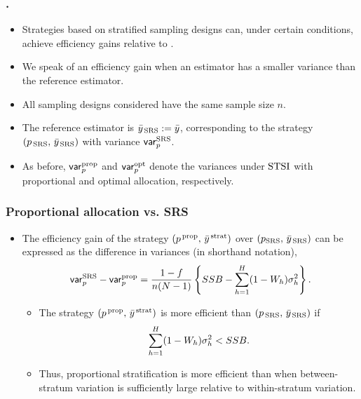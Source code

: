 \documentclass{my_eth_beamer}
\numberwithin{equation}{section}
\begin{document}
\begin{frame}
    \frametitle{\insertsectionnumber.\insertsubsectionnumber~\insertsubsection}
    \begin{itemize}
    \setlength{\itemsep}{12pt}
        \item Strategies based on stratified sampling designs can, under
            certain conditions, achieve \alert{efficiency gains} relative to
            \SRS.
        \item We speak of an efficiency gain when an estimator has a
            \alert{smaller variance than the reference estimator}.
        \item All sampling designs considered have the \alert{same sample size}
            $n$.
        \item The \alert{reference estimator} is $\bar{y}_{\,\mathrm{SRS}} := \bar{y}$,
            corresponding to the strategy $(p_{\,\mathrm{SRS}}, \, \bar{y}_{\,\mathrm{SRS}})$ with variance
            $\mathsf{var}_p^{\mathrm{SRS}}$.
        \item As before, $\mathsf{var}_p^{\mathrm{prop}}$ and $\mathsf{var}_p^{\mathrm{opt}}$ denote the
            variances under $\mathrm{STSI}$ with proportional and optimal allocation,
            respectively.
    \end{itemize}
\end{frame}

\begin{frame}
    \frametitle{\normalsize Proportional allocation vs. SRS}
    \vspace{-0.5em}
    \begin{itemize}
    \setlength{\itemsep}{8pt}
        \item The \alert{efficiency gain} of the strategy
            $(p^{\,\mathrm{prop}},\, \bar{y}^{\,\mathrm{strat}})$ over
            $(p_{\mathrm{SRS}},\,\bar{y}_{\,\mathrm{SRS}})$ can be
            expressed as the \alert{difference in variances} (in shorthand
            notation),
            \begin{equation*}
                \mathsf{var}_p^{\mathrm{SRS}} - \mathsf{var}_p^{\mathrm{prop}} = \frac{1 - f}{n(N - 1)}\left\{SSB
                    - \sum_{h = 1}^H (1 - W_h)\sigma_{h}^2 \right\}.
            \end{equation*}
        \begin{itemize}
        \setlength{\itemsep}{8pt}
            \item[\goto] The strategy $(p^{\,\mathrm{prop}},\,
                \bar{y}^{\,\mathrm{strat}})$ is \alert{more efficient} than
                $(p_{\,\mathrm{SRS}}, \, \bar{y}_{\,\mathrm{SRS}})$ if
                \begin{equation*}
                    \sum_{h = 1}^H (1 - W_h) \sigma_{h}^2 < SSB.
                \end{equation*}
            \item[\goto] Thus, proportional stratification is more efficient
                than \SRS when \alert{between-} \alert{stratum variation} is
                sufficiently large relative to \alert{within-stratum
                variation}.
        \end{itemize}
    \end{itemize}
\end{frame}
\end{document}
